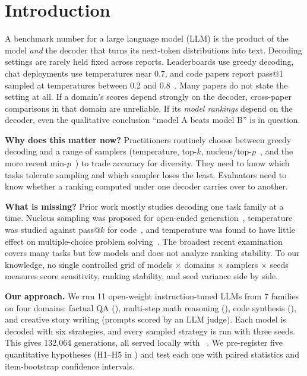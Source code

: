 \section{Introduction}
\label{sec:intro}

A benchmark number for a large language model (LLM) is the product of the model \emph{and} the decoder that turns its next-token distributions into text. Decoding settings are rarely held fixed across reports. Leaderboards use greedy decoding, chat deployments use temperatures near 0.7, and code papers report pass@1 sampled at temperatures between 0.2 and 0.8~\citep{chen2021codex}. Many papers do not state the setting at all. If a domain's scores depend strongly on the decoder, cross-paper comparisons in that domain are unreliable. If its \emph{model rankings} depend on the decoder, even the qualitative conclusion ``model A beats model B'' is in question.

{\bf Why does this matter now?} Practitioners routinely choose between greedy decoding and a range of samplers (temperature, top-$k$, nucleus/top-$p$~\citep{holtzman2020curious}, and the more recent min-$p$~\citep{nguyen2024minp}) to trade accuracy for diversity. They need to know which tasks tolerate sampling and which sampler loses the least. Evaluators need to know whether a ranking computed under one decoder carries over to another.

{\bf What is missing?} Prior work mostly studies decoding one task family at a time. Nucleus sampling was proposed for open-ended generation~\citep{holtzman2020curious}, temperature was studied against pass@$k$ for code~\citep{chen2021codex}, and temperature was found to have little effect on multiple-choice problem solving~\citep{renze2024temperature}. The broadest recent examination~\citep{shi2024thorough} covers many tasks but few models and does not analyze ranking stability. To our knowledge, no single controlled grid of models $\times$ domains $\times$ samplers $\times$ seeds measures score sensitivity, ranking stability, and seed variance side by side.

{\bf Our approach.} We run 11 open-weight instruction-tuned LLMs from 7 families on four domains: factual QA (\triviaqa), multi-step math reasoning (\gsm), code synthesis (\humaneval), and creative story writing (\rocstories prompts scored by an LLM judge). Each model is decoded with six strategies, and every sampled strategy is run with three seeds. This gives 132{,}064 generations, all served locally with \vllm~\citep{kwon2023vllm}. We pre-register five quantitative hypotheses (H1--H5 in ) and test each one with paired statistics and item-bootstrap confidence intervals.

